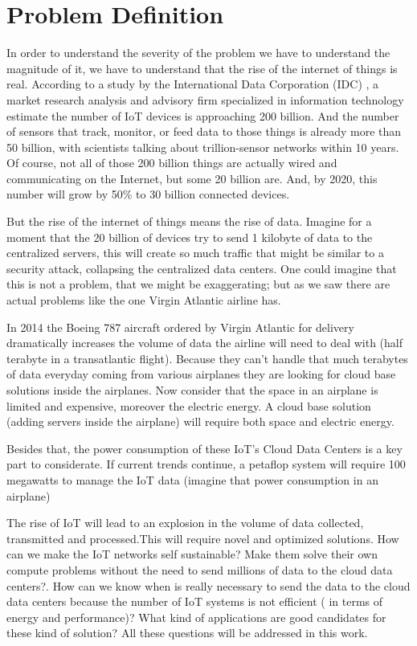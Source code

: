 \section{Problem Definition}
\noindent

In order to understand the severity of the problem we have to understand the
magnitude of it, we have to understand that the rise of the internet of things
is real.  According to a study by the International Data Corporation (IDC)
\cite{IDC}, a market research analysis and advisory firm specialized in
information technology estimate the number of IoT devices is approaching  200
billion. And the number of sensors that track, monitor, or feed data to those
things is already more than 50 billion, with scientists talking about
trillion-sensor networks within 10 years. Of course, not all of those 200
billion things are actually wired and communicating on the Internet, but some
20 billion are. And, by 2020, this number will grow by 50\% to 30 billion
connected devices.\cite{EMC1}

But the rise of the internet of things means the rise of data. Imagine for a
moment that the 20 billion of devices try to send 1 kilobyte of data to the
centralized servers, this will create so much traffic that might be similar to
a security attack, collapsing the centralized data centers. One could imagine
that this is not a problem, that we might be exaggerating; but as we saw there
are actual problems like the one Virgin Atlantic airline has.

In 2014 the Boeing 787 aircraft ordered by Virgin Atlantic for delivery
dramatically increases the volume of data the airline will need to deal with
(half terabyte in a transatlantic flight). \cite{Finnegan} Because they can't
handle that much terabytes of data everyday coming from various airplanes they
are looking for cloud base solutions inside the airplanes. Now consider that
the space in an airplane is limited and expensive, moreover the electric
energy. A cloud base solution (adding servers inside the airplane) will require
both space and electric energy.

Besides that, the power consumption of these  IoT's Cloud Data Centers is a key
part to considerate. If current trends continue, a petaflop system will require 
100 megawatts to manage the IoT data \cite {Xizhou} (imagine that power
consumption in an airplane)

The rise of IoT will lead to an explosion in the volume of data collected,
transmitted and processed.This will require novel and optimized solutions.  How
can we make the IoT networks self sustainable? Make them solve their own
compute problems without the need to send millions of data to the cloud data
centers?. How can we know when is really necessary to send the data to the cloud
data centers because the number of IoT systems is not efficient ( in terms of
energy and performance)? What kind of applications are good candidates for
these kind of solution? All these questions will be addressed in this work. 

